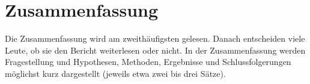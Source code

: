 \chapter{Zusammenfassung}
\label{chap:summary}

Die Zusammenfassung wird am zweithäufigsten gelesen. Danach entscheiden viele Leute, ob sie den Bericht weiterlesen oder nicht. In der Zusammenfassung werden Fragestellung und Hypothesen, Methoden, Ergebnisse und Schlussfolgerungen möglichst kurz dargestellt (jeweils etwa zwei bis drei Sätze).
